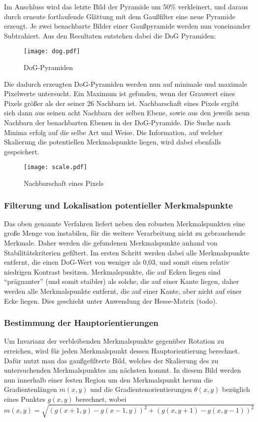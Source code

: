 Im Anschluss wird das letzte Bild der Pyramide um 50\% verkleinert, und daraus durch erneute fortlaufende Glättung mit dem Gaußfilter eine neue Pyramide erzeugt.
Je zwei benachbarte Bilder einer Gaußpyramide werden nun voneinander Subtrahiert. Aus den Resultaten entstehen dabei die DoG Pyramiden:
\begin{figure}
  \begin{center}
    \texttt{[image: dog.pdf]}
    \caption{DoG-Pyramiden}
    \label{fig:dog_pyr}
  \end{center}
\end{figure}

Die dadurch erzeugten DoG-Pyramiden werden nun auf minimale und maximale Pixelwerte untersucht.
Ein Maximum ist gefunden, wenn der Grauwert eines Pixels größer als der seiner 26 Nachbarn ist. Nachbarschaft eines Pixels ergibt sich dann aus seinen acht Nachbarn der selben Ebene, sowie aus den jeweils neun Nachbarn der benachbarten Ebenen in der DoG-Pyramide.
Die Suche nach Minima erfolg auf die selbe Art und Weise. Die Information, auf welcher Skalierung die potentiellen Merkmalspunkte liegen, wird dabei ebenfalls gespeichert.
\begin{figure}[H]
  \begin{center}
    \texttt{[image: scale.pdf]}
    \caption{Nachbarschaft eines Pixels}
    \label{fig:neighbor}
  \end{center}
\end{figure}
	\subsubsection{Filterung und Lokalisation potentieller Merkmalspunkte}
		Das oben genannte Verfahren liefert neben den robusten Merkmalspunkten eine große Menge von instabilen, für die weitere Verarbeitung nicht zu gebrauchende Merkmale.
Daher werden die gefundenen Merkmalspunkte anhand von Stabilitätskriterien gefiltert.
Im ersten Schritt werden dabei alle Merkmalspunkte entfernt, die einen DoG-Wert von weniger als 0,03, und somit einen relativ niedrigen Kontrast besitzen.
Merkmalspunkte, die auf Ecken liegen sind “prägnanter” (und somit staibler) als solche, die auf einer Kante liegen, daher werden alle Merkmalspunkte entfernt, die auf einer Kante, aber nicht auf einer Ecke liegen.
Dies geschieht unter Anwendung der Hesse-Matrix (todo).
	\subsubsection{Bestimmung der Hauptorientierungen}
		Um Invarianz der verbleibenden Merkmalspunkte gegenüber Rotation zu erreichen, wird für jeden Merkmalspunkt dessen Hauptorientierung berechnet.
Dafür nutzt man das gaußgefilterte Bild, welches der Skalierung des zu untersuchenden Merkmalspunktes am nächsten kommt. In diesem Bild werden nun innerhalb einer festen Region um den Merkmalspunkt herum die Gradientenlängen $m(x, y)$ und die Gradientenorientierungen $\theta (x, y)$ bezüglich eines Punktes $g(x, y)$ berechnet, wobei
\begin{equation*}
m(x, y) = \sqrt{(g(x + 1, y) - g(x - 1, y))^2 +(g(x, y+1) - g(x, y-1))^2}
\end{equation*}

